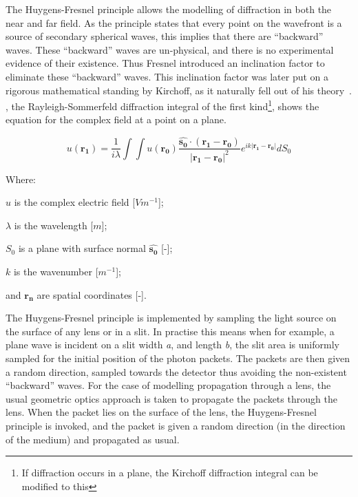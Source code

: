 The Huygens-Fresnel principle allows the modelling of diffraction in both the near and far field.
As the principle states that every point on the wavefront is a source of secondary spherical waves, this implies that there are ``backward'' waves.
These ``backward'' waves are un-physical, and there is no experimental evidence of their existence.
Thus Fresnel introduced an inclination factor to eliminate these ``backward'' waves.
This inclination factor was later put on a rigorous mathematical standing by Kirchoff, as it naturally fell out of his theory~\cite{kirchhoff1883ann,born2000principles}.
, the Rayleigh-Sommerfeld diffraction integral of the first kind\footnote{If diffraction occurs in a plane, the Kirchoff diffraction integral can be modified to this}, shows the equation for the complex field at a point on a plane.

\begin{equation}
u(\mathbf{r_1})=\frac{1}{i\lambda}\int\int u(\mathbf{r_0})\frac{\mathbf{\hat{s_0}} \cdot (\mathbf{r_1} - \mathbf{r_0})}{\left|\mathbf{r_1} - \mathbf{r_0}\right|^2}e^{ik\left|\mathbf{r_1} - \mathbf{r_0}\right|}dS_0
\label{eqn:kirchhoffeqn}
\end{equation}

\noindent Where:

    \indent $u$ is the complex electric field [$Vm^{-1}$];

    \indent $\lambda$ is the wavelength [$m$];

    \indent $S_0$ is a plane with surface normal $\mathbf{\hat{s_0}}$ [-];

    \indent $k$ is the wavenumber [$m^{-1}$];

    \indent and $\mathbf{r_n}$ are spatial coordinates [-]. 

\medskip

The Huygens-Fresnel principle is implemented by sampling the light source on the surface of any lens or in a slit.
In practise this means when for example, a plane wave is incident on a slit width \textit{a}, and length \textit{b}, the slit area is uniformly sampled for the initial position of the photon packets.
The packets are then given a random direction, sampled towards the detector thus avoiding the non-existent ``backward'' waves.
For the case of modelling propagation through a lens, the usual geometric optics approach is taken to propagate the packets through the lens.
When the packet lies on the surface of the lens, the Huygens-Fresnel principle is invoked, and the packet is given a random direction (in the direction of the medium) and propagated as usual.

